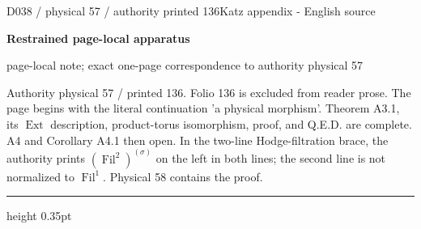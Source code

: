 \documentclass[9pt]{article}
\newcommand{\CanonText}[1]{\par{\fontsize{8.0}{9.35}\selectfont\RaggedRight #1\par}\vspace{2.2pt}}
\newcommand{\LayerTitle}{Restrained page-local apparatus}
\begin{document}
\noindent\begin{minipage}[t][\dimexpr\textheight-5pt\relax][t]{\textwidth}
{\sffamily\fontsize{7.3}{8.2}\selectfont\color{Quiet} D038 / physical 57 / authority printed 136\hfill Katz appendix - English source}
\par{}\vspace{4.5pt}
{\sffamily\fontsize{10.4}{11.6}\selectfont\bfseries\color{Accent} \LayerTitle}
\par{\sffamily\fontsize{6.7}{7.7}\selectfont\color{Quiet} page-local note; exact one-page correspondence to authority physical 57}
\vspace{5pt}
\CanonText{Authority physical 57 / printed 136. Folio 136 is excluded from reader prose. The page begins with the literal continuation 'a physical morphism'. Theorem A3.1, its \(\operatorname{Ext}\) description, product-torus isomorphism, proof, and Q.E.D. are complete. A4 and Corollary A4.1 then open. In the two-line Hodge-filtration brace, the authority prints \((\operatorname{Fil}^{2})^{(\sigma{})}\) on the left in both lines; the second line is not normalized to \(\operatorname{Fil}^{1}\). Physical 58 contains the proof.}
\vfill
{\color{Accent}\hrule height 0.35pt}\vspace{3pt}
\end{minipage}
\newpage
\end{document}
